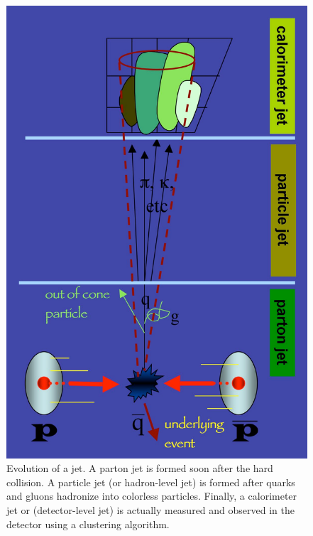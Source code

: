 \begin{figure}[p]
\begin{centering}
\includegraphics[scale=0.14]{PartonJetPartcleJetAndCalJet.pdf}
\caption{Evolution of a jet. A parton jet is formed soon after the hard collision. A particle jet (or hadron-level jet) is formed after quarks and gluons hadronize into colorless particles. Finally, a calorimeter jet or (detector-level jet) is actually measured and observed in the detector using a clustering algorithm.}
\label{fig:jetdefinition}
\end{centering}
\end{figure}

